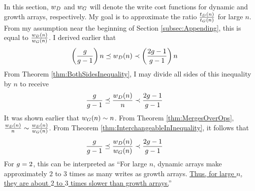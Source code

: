 \HdrTimeComplexCmp

In this section, $w_D$ and $w_G$ will denote the write cost functions for dynamic and growth arrays, respectively. My goal is to approximate the ratio $\frac{t_D(n)}{t_G(n)}$ for large $n$. From my assumption near the beginning of Section \ref{subsec:Appending}, this is equal to $\frac{w_D(n)}{w_G(n)}$. I derived earlier that
\begin{align*}
\left( \frac{g}{g - 1} \right) n \preceq w_D(n) &\prec \left( \frac{2g - 1}{g - 1} \right) n
\end{align*}
From Theorem \ref{thm:BothSidesInequality}, I may divide all sides of this inequality by $n$ to receive
\begin{align*}
\frac{g}{g - 1} \preceq \frac {w_D(n)} n &\prec \frac{2g - 1}{g - 1}
\end{align*}
It was shown earlier that $w_G(n) \sim n$. From Theorem \ref{thm:MergesOverOps}, $\frac {w_D(n)} n \sim \frac{w_D(n)}{w_G(n)}$. From Theorem \ref{thm:InterchangeableInInequality}, it follows that
\begin{align*}
\frac{g}{g - 1} \preceq \frac {w_D(n)} {w_G(n)} &\prec \frac{2g - 1}{g - 1}
\end{align*}
For $g = 2$, this can be interpreted as ``For large $n$, dynamic arrays make approximately $2$ to $3$ times as many writes as growth arrays. \underline{Thus, for large $n$, they are about $2$ to $3$ times slower than growth arrays.}''

\HdrSpaceComplexCmp

